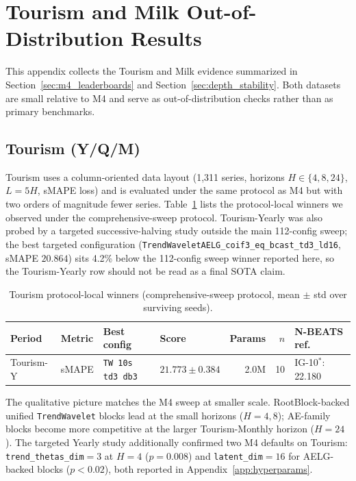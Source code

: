 \documentclass{article}
\begin{document}
\section{Tourism and Milk Out-of-Distribution Results}
\label{app:ood}

This appendix collects the Tourism and Milk evidence summarized in Section~\ref{sec:m4_leaderboards} and Section~\ref{sec:depth_stability}. Both datasets are small relative to M4 and serve as out-of-distribution checks rather than as primary benchmarks.

\subsection{Tourism (Y/Q/M)}

Tourism uses a column-oriented data layout (1{,}311 series, horizons $H \in \{4, 8, 24\}$, $L = 5H$, sMAPE loss) and is evaluated under the same protocol as M4 but with two orders of magnitude fewer series. Table~\ref{tab:tourism_winners} lists the protocol-local winners we observed under the comprehensive-sweep protocol. Tourism-Yearly was also probed by a targeted successive-halving study outside the main 112-config sweep; the best targeted configuration (\texttt{TrendWaveletAELG\_coif3\_eq\_bcast\_td3\_ld16}, sMAPE $20.864$) sits 4.2\% below the 112-config sweep winner reported here, so the Tourism-Yearly row should not be read as a final SOTA claim.

\begin{table}[h]
  \caption{Tourism protocol-local winners (comprehensive-sweep protocol, mean $\pm$ std over surviving seeds).}
  \label{tab:tourism_winners}
  \centering
  \scriptsize
  \setlength{\tabcolsep}{3pt}
  \begin{tabular}{llllrrl}
    \toprule
    Period & Metric & Best config & Score & Params & $n$ & N-BEATS ref. \\
    \midrule
    Tourism-Y & sMAPE & \texttt{TW 10s td3 db3}    & $21.773 \pm 0.384$ & 2.0M & 10 & IG-10$^*$: 22.180 \\
    \bottomrule
  \end{tabular}
\end{table}

The qualitative picture matches the M4 sweep at smaller scale. RootBlock-backed unified \texttt{TrendWavelet} blocks lead at the small horizons ($H = 4, 8$); AE-family blocks become more competitive at the larger Tourism-Monthly horizon ($H = 24$). The targeted Yearly study additionally confirmed two M4 defaults on Tourism: \texttt{trend\_thetas\_dim}$=3$ at $H=4$ ($p=0.008$) and \texttt{latent\_dim}$=16$ for AELG-backed blocks ($p<0.02$), both reported in Appendix~\ref{app:hyperparams}.
\end{document}
